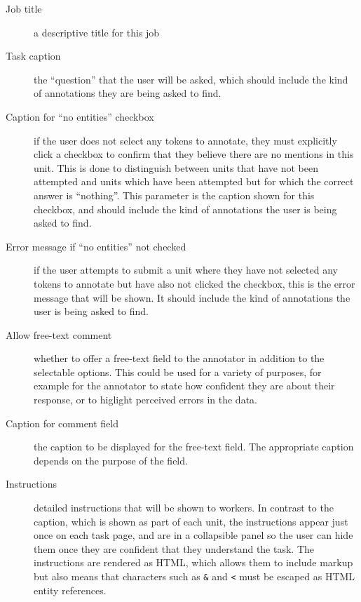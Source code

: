\begin{description}
\item[Job title] a descriptive title for this job %
\item[Task caption] the ``question'' that the user will be asked, which should
  include the kind of annotations they are being asked to find.
\item[Caption for ``no entities'' checkbox] if the user does not select any
  tokens to annotate, they must explicitly click a checkbox to confirm that
  they believe there are no mentions in this unit.  This is done to distinguish
  between units that have not been attempted and units which have been
  attempted but for which the correct answer is ``nothing''.  This parameter is
  the caption shown for this checkbox, and should include the kind of
  annotations the user is being asked to find.
\item[Error message if ``no entities'' not checked] if the user attempts to
  submit a unit where they have not selected any tokens to annotate but have
  also not clicked the checkbox, this is the error message that will be shown.
  It should include the kind of annotations the user is being asked to find.
\item[Allow free-text comment] whether to offer a free-text field to the
  annotator in addition to the selectable options.  This could be used for a
  variety of purposes, for example for the annotator to state how confident
  they are about their response, or to higlight perceived errors in the data.
\item[Caption for comment field] the caption to be displayed for the free-text
  field.  The appropriate caption depends on the purpose of the field.
\item[Instructions] detailed instructions that will be shown to workers.  In
  contrast to the caption, which is shown as part of each unit, the
  instructions appear just once on each task page, and are in a collapsible
  panel so the user can hide them once they are confident that they understand
  the task.  The instructions are rendered as HTML, which allows them to
  include markup but also means that characters such as \verb!&! and \verb!<!
  must be escaped as HTML entity references.
\end{description}

